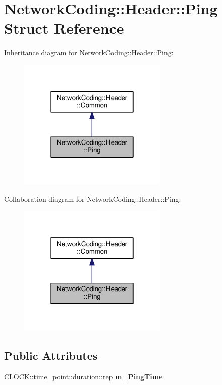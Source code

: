 \hypertarget{struct_network_coding_1_1_header_1_1_ping}{}\section{Network\+Coding\+:\+:Header\+:\+:Ping Struct Reference}
\label{struct_network_coding_1_1_header_1_1_ping}


Inheritance diagram for Network\+Coding\+:\+:Header\+:\+:Ping\+:\nopagebreak
\begin{figure}[H]
\begin{center}
\leavevmode
\includegraphics[width=202pt]{struct_network_coding_1_1_header_1_1_ping__inherit__graph}
\end{center}
\end{figure}


Collaboration diagram for Network\+Coding\+:\+:Header\+:\+:Ping\+:\nopagebreak
\begin{figure}[H]
\begin{center}
\leavevmode
\includegraphics[width=202pt]{struct_network_coding_1_1_header_1_1_ping__coll__graph}
\end{center}
\end{figure}
\subsection*{Public Attributes}
\begin{DoxyCompactItemize}
\item 
C\+L\+O\+C\+K\+::time\+\_\+point\+::duration\+::rep {\bfseries m\+\_\+\+Ping\+Time}\hypertarget{struct_network_coding_1_1_header_1_1_ping_adf48346b5f6f3438534c14943b72a098}{}\label{struct_network_coding_1_1_header_1_1_ping_adf48346b5f6f3438534c14943b72a098}

\end{DoxyCompactItemize}
